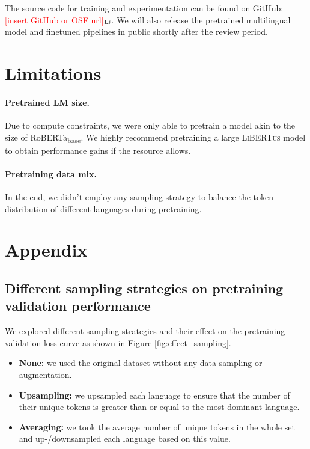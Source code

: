 \documentclass[11pt]{article}
\newcommand{\draftonly}[1]{#1}
\newcommand{\draftcomment}[3]{\draftonly{\textcolor{#2}{[#3]{$_{\textsc{#1}}$}}}}
\newcommand{\lj}[1]{\draftcomment{Lj}{red}{#1}}
\newcommand{\libertus}{\textsc{LiBERTus}}
\begin{document}
The source code for training and experimentation can be found on GitHub: \lj{insert GitHub or OSF url}.
We will also release the pretrained multilingual model and finetuned pipelines in public shortly after the review period.

\section*{Limitations}

\paragraph{Pretrained LM size.}
Due to compute constraints, we were only able to pretrain a model akin to the size of RoBERTa\textsubscript{base}.
We highly recommend pretraining a large \libertus{} model to obtain performance gains if the resource allows.

\paragraph{Pretraining data mix.}
In the end, we didn't employ any sampling strategy to balance the token distribution of different languages during pretraining.





\appendix

\section{Appendix}
\label{sec:appendix}

\subsection{Different sampling strategies on pretraining validation performance}

We explored different sampling strategies and their effect on the pretraining validation loss curve as shown in Figure \ref{fig:effect_sampling}.

\begin{itemize}
  \item \textbf{None:} we used the original dataset without any data sampling or augmentation.
  \item \textbf{Upsampling:} we upsampled each language to ensure that the number of their unique tokens is greater than or equal to the most dominant language.
  \item \textbf{Averaging:} we took the average number of unique tokens in the whole set and up-/downsampled each language based on this value.
\end{itemize}
\end{document}
